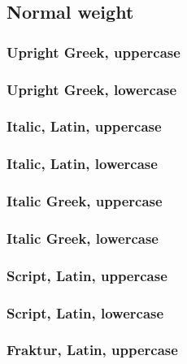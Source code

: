 \documentclass[final]{article}
\newcounter{#1}
\begin{document}
\ExplSyntaxOff

\subsection{Normal weight}

\subsubsection{Upright Greek, uppercase}

\subsubsection{Upright Greek, lowercase}

\subsubsection{Italic, Latin, uppercase}

\subsubsection{Italic, Latin, lowercase}

\subsubsection{Italic Greek, uppercase}

\subsubsection{Italic Greek, lowercase}

\subsubsection{Script, Latin, uppercase}

\subsubsection{Script, Latin, lowercase}

\subsubsection{Fraktur, Latin, uppercase}
\end{document}
